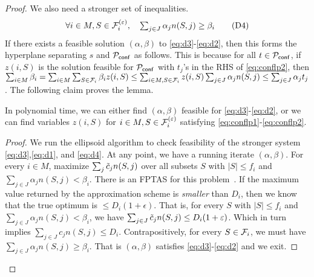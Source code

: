 \begin{proof}
We also need a stronger set of 	inequalities.
\begin{equation}\label{eq:d4}
 \textstyle \forall i\in M, S\in{\cal F}^{(\varepsilon)}_i, \quad \sum_{j\in J} \alpha_j n(S,j)  \geq \beta_i  \tag{D4}
\end{equation}
If there exists a feasible solution $(\alpha,\beta)$ to \eqref{eq:d3}-\eqref{eq:d2}, then this forms the hyperplane separating $s$ and ${\cal P}_\mathsf{conf}$ as follows.
This is because for all $t\in {\cal P}_\mathsf{conf}$, if  $z(i,S)$ is the solution feasible for ${\cal P}_\mathsf{conf}$ with $t_j$'s in the RHS of \eqref{eq:conflp2}, 
then $\sum_{i\in M}\beta_i = \sum_{i\in M} \sum_{S\in {\cal F}_i} \beta_i z(i,S) \leq \sum_{i\in M,S\in {\cal F}_i} z(i,S) \sum_{j\in J} \alpha_jn(S,j) \leq \sum_{j\in J} \alpha_j t_j$.
The following claim proves the lemma.\smallskip

\begin{claim}
In polynomial time, we can either find $(\alpha,\beta)$ feasible for \eqref{eq:d3}-\eqref{eq:d2}, or we can find variables $z(i,S)$ for $i\in M,S\in {\cal F}^{(\varepsilon)}_i$ satisfying
\eqref{eq:conflp1}-\eqref{eq:conflp2}.
\end{claim}
\begin{proof}
We run the ellipsoid algorithm to check feasibility of the stronger system \eqref{eq:d3},\eqref{eq:d1}, and \eqref{eq:d4}.
At any point, we have a running iterate $(\alpha,\beta)$. %
For every $i\in M$, maximize $\sum_j \tilde{c}_j n(S,j)$ over all subsets $S$ with $|S|\leq f_i$ and $\sum_{j\in J} \alpha_j n(S,j) < \beta_i$.
There is an FPTAS for this problem~\cite{CapraraKPP00}.  If the maximum value returned by the approximation scheme is {\em smaller} than $D_i$, then 
we know that the true optimum is $\leq D_i(1+\epsilon)$. That is, for every $S$ with $|S| \leq f_i$ and $\sum_{j\in J}\alpha_j n(S,j) < \beta_i$, we have $\sum_{j\in J} \tilde{c}_jn(S,j) \le D_i(1+\varepsilon)$.
Which in turn implies $\sum_{j\in J} c_jn(S,j) \leq D_i$. Contrapositively, for every $S\in {\cal F}_i$, we must have $\sum_{j\in J} \alpha_j n(S,j) \geq \beta_i$. %
That is $(\alpha,\beta)$ satisfies \eqref{eq:d3}-\eqref{eq:d2} and we exit.


\end{proof}
\end{proof}
